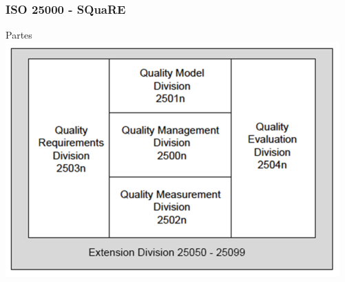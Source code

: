 \begin{frame}[hasnext=true, hasprev=true]
	\frametitle{ISO 25000 - SQuaRE}

	\begin{block:fact}{Partes}
		\centering
		\includegraphics[width=.8\textwidth]{software-engineering/project-management/product/square}
	\end{block:fact}
\end{frame}



